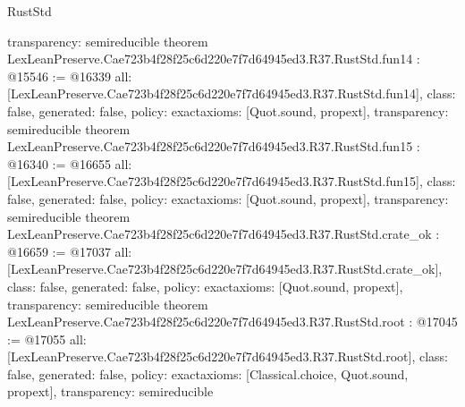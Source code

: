 \begin{lexlean}{RustStd}
\begin{coremodule}
{  transparency: semireducible
}
theorem LexLeanPreserve.Cae723b4f28f25c6d220e7f7d64945ed3.R37.RustStd.fun14 : @15546 := @16339 {
  all: [LexLeanPreserve.Cae723b4f28f25c6d220e7f7d64945ed3.R37.RustStd.fun14],
  class: false,
  generated: false,
  policy: exact{axioms: [Quot.sound, propext]},
  transparency: semireducible
}
theorem LexLeanPreserve.Cae723b4f28f25c6d220e7f7d64945ed3.R37.RustStd.fun15 : @16340 := @16655 {
  all: [LexLeanPreserve.Cae723b4f28f25c6d220e7f7d64945ed3.R37.RustStd.fun15],
  class: false,
  generated: false,
  policy: exact{axioms: [Quot.sound, propext]},
  transparency: semireducible
}
theorem LexLeanPreserve.Cae723b4f28f25c6d220e7f7d64945ed3.R37.RustStd.crate_ok : @16659 := @17037 {
  all: [LexLeanPreserve.Cae723b4f28f25c6d220e7f7d64945ed3.R37.RustStd.crate_ok],
  class: false,
  generated: false,
  policy: exact{axioms: [Quot.sound, propext]},
  transparency: semireducible
}
theorem LexLeanPreserve.Cae723b4f28f25c6d220e7f7d64945ed3.R37.RustStd.root : @17045 := @17055 {
  all: [LexLeanPreserve.Cae723b4f28f25c6d220e7f7d64945ed3.R37.RustStd.root],
  class: false,
  generated: false,
  policy: exact{axioms: [Classical.choice, Quot.sound, propext]},
  transparency: semireducible
}


\end{coremodule}
\end{lexlean}
